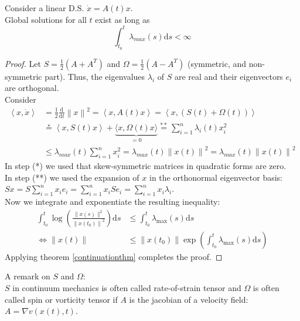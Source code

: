 \begin{framed}
\begin{lemma} Consider a linear D.S. $\dot x = A(t) x$.\\
    Global solutions for all $t$ exist as long as
    $$\int_{t_0}^t \lambda_{max}(s) \text{d}s < \infty$$
\end{lemma}
\end{framed}
\begin{proof}
    Let $S = \frac{1}{2}(A+A^T)$ and $\Omega = \frac{1}{2}(A-A^T)$ (symmetric, and non-symmetric part). Thus, the eigenvalues $\lambda_i$ of $S$ are real and their eigenvectors $e_i$ are orthogonal.\\
    Consider
    \begin{align*}
        \left \langle x,\dot x \right \rangle &= \frac{1}{2} \frac{\text{d}}{\text{d}t}\left\lVert x \right\rVert^2=\left \langle x,A(t)x \right \rangle=\left \langle x,\left ( S(t)+\Omega(t)\right )  \right \rangle\\
        &\stackrel{*}{=} \left \langle x,S(t)x \right \rangle+\underbrace{\langle x, \Omega(t) x\rangle}_{=0} \stackrel{**}{=} \sum_{i=1}^{n}\lambda_i(t)x_i^2\\
        &\leq \lambda_{max}(t) \sum_{i=1}^{n} x_i^2 = \lambda_{max} (t) \left\lVert x(t) \right\rVert^2 = \lambda_{max}(t)\left\lVert x(t) \right\rVert ^2
    \end{align*}
    In step (*) we used that skew-symmetric matrices in quadratic forms are zero.\\
    In step (**) we used the expansion of $x$ in the orthonormal eigenvector basis: \\$Sx=S\sum_{i=1}^{n}x_i e_i = \sum_{i=1}^{n}x_i S e_i = \sum_{i=1}^{n}x_i \lambda_i$.\\
    Now we integrate and exponentiate the resulting inequality:
    \begin{align*}
        \int_{t_0}^t \log \left(\frac{\|x(s)\|^2}{\left\|x\left(t_0\right)\right\|^2}\right) \text{d} s &\leq \int_{t_0}^t \lambda_{\max }(s) \text{d}s\\
        \iff \|x(t)\| &\leq\left\|x\left(t_0\right)\right\| \exp \left(\int_{t_0}^t \lambda_{\max }(s) \text{d} s\right)
    \end{align*}
    Applying theorem \ref{continuationthm} completes the proof.
\end{proof}
A remark on $S$ and $\Omega$:\\
$S$ in continuum mechanics is often called rate-of-strain tensor and $\Omega$ is often called spin or vorticity tensor if $A$ is the jacobian of a velocity field: $A = \nabla v (x(t),t)$.

